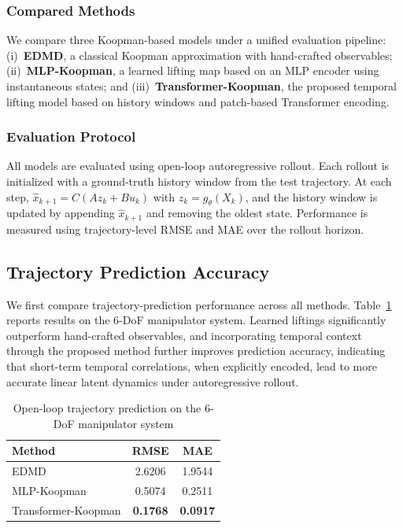 \documentclass[journal]{IEEEtran}
\begin{document}
\subsubsection{Compared Methods}

We compare three Koopman-based models under a unified evaluation pipeline: (i)~\textbf{EDMD}, a classical Koopman approximation with hand-crafted observables; (ii)~\textbf{MLP-Koopman}, a learned lifting map based on an MLP encoder using instantaneous states; and (iii)~\textbf{Transformer-Koopman}, the proposed temporal lifting model based on history windows and patch-based Transformer encoding.

\subsubsection{Evaluation Protocol}
\label{sec:eval_protocol}

All models are evaluated using open-loop autoregressive rollout. Each rollout is initialized with a ground-truth history window from the test trajectory. At each step, $\hat{x}_{k+1} = C(A z_k + B u_k)$ with $z_k = g_\theta(X_k)$, and the history window is updated by appending $\hat{x}_{k+1}$ and removing the oldest state. Performance is measured using trajectory-level RMSE and MAE over the rollout horizon.

\subsection{Trajectory Prediction Accuracy}

We first compare trajectory-prediction performance across all methods. Table~\ref{tab:prediction_platform_a} reports results on the 6-DoF manipulator system. Learned liftings significantly outperform hand-crafted observables, and incorporating temporal context through the proposed method further improves prediction accuracy, indicating that short-term temporal correlations, when explicitly encoded, lead to more accurate linear latent dynamics under autoregressive rollout.

\begin{table}[!t]
\renewcommand{\arraystretch}{1.2}
\caption{Open-loop trajectory prediction on the 6-DoF manipulator system}
\label{tab:prediction_platform_a}
\centering
\begin{tabular}{lcc}
\toprule
Method & RMSE & MAE \\
\midrule
EDMD & 2.6206 & 1.9544 \\
MLP-Koopman & 0.5074 & 0.2511 \\
Transformer-Koopman & \textbf{0.1768} & \textbf{0.0917} \\
\bottomrule
\end{tabular}
\end{table}
\end{document}
